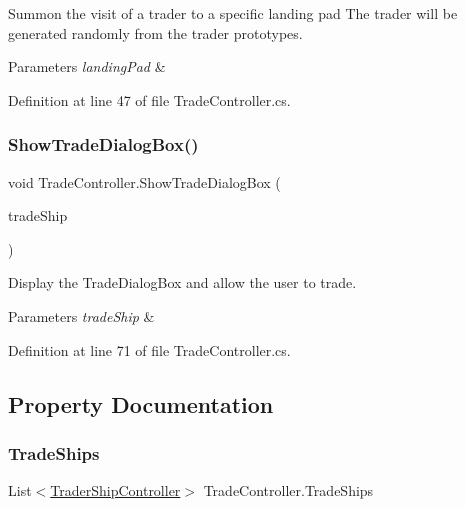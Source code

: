 Summon the visit of a trader to a specific landing pad The trader will be generated randomly from the trader prototypes. 


\begin{DoxyParams}{Parameters}
{\em landing\+Pad} & \\
\hline
\end{DoxyParams}


Definition at line 47 of file Trade\+Controller.\+cs.

\mbox{\label{class_trade_controller_a3b10006f08fa95dc787eb1e669431a96}} 
\subsubsection{\texorpdfstring{Show\+Trade\+Dialog\+Box()}{ShowTradeDialogBox()}}
{\footnotesize\ttfamily void Trade\+Controller.\+Show\+Trade\+Dialog\+Box (\begin{DoxyParamCaption}\item[{\hyperlink{class_trader_ship_controller}{Trader\+Ship\+Controller}}]{trade\+Ship }\end{DoxyParamCaption})}



Display the Trade\+Dialog\+Box and allow the user to trade. 


\begin{DoxyParams}{Parameters}
{\em trade\+Ship} & \\
\hline
\end{DoxyParams}


Definition at line 71 of file Trade\+Controller.\+cs.



\subsection{Property Documentation}
\mbox{\label{class_trade_controller_a176bd07b91984f599e56ce39664f41ff}} 
\subsubsection{\texorpdfstring{Trade\+Ships}{TradeShips}}
{\footnotesize\ttfamily List$<$\hyperlink{class_trader_ship_controller}{Trader\+Ship\+Controller}$>$ Trade\+Controller.\+Trade\+Ships\hspace{0.3cm}{\ttfamily [get]}}



